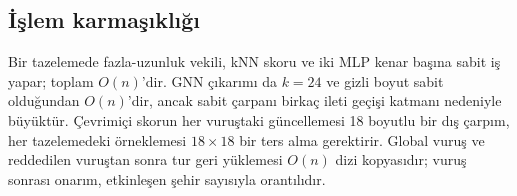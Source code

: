 \subsection{İşlem karmaşıklığı}\label{sec:yontem-karmasiklik}

Bir tazelemede fazla-uzunluk vekili, kNN skoru ve iki MLP kenar başına sabit iş yapar; toplam
$O(n)$'dir. GNN çıkarımı da $k=24$ ve gizli boyut sabit olduğundan $O(n)$'dir, ancak sabit çarpanı
birkaç ileti geçişi katmanı nedeniyle büyüktür. Çevrimiçi skorun her vuruştaki güncellemesi 18
boyutlu bir dış çarpım, her tazelemedeki örneklemesi $18\times18$ bir ters alma gerektirir. Global
vuruş ve reddedilen vuruştan sonra tur geri yüklemesi $O(n)$ dizi kopyasıdır; vuruş sonrası onarım,
etkinleşen şehir sayısıyla orantılıdır.
